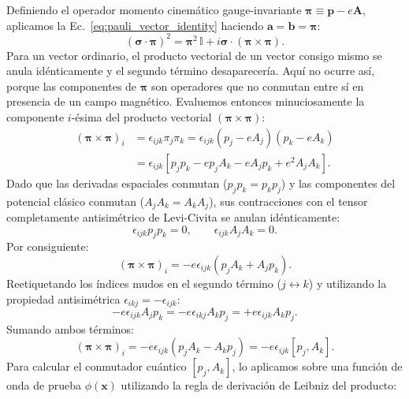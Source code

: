 \documentclass[10pt,a4paper]{article}
\begin{document}
Definiendo el operador momento cinemático gauge-invariante $\boldsymbol{\pi} \equiv \mathbf{p} - e\mathbf{A}$, aplicamos la Ec.~\eqref{eq:pauli_vector_identity} haciendo $\mathbf{a} = \mathbf{b} = \boldsymbol{\pi}$:
\begin{equation}
(\boldsymbol{\sigma} \cdot \boldsymbol{\pi})^2 = \boldsymbol{\pi}^2 \, \mathbb{I} + i \boldsymbol{\sigma} \cdot (\boldsymbol{\pi} \times \boldsymbol{\pi}).
\label{eq:pi_squared}
\end{equation}
Para un vector ordinario, el producto vectorial de un vector consigo mismo se anula idénticamente y el segundo término desaparecería. Aquí no ocurre así, porque las componentes de $\boldsymbol{\pi}$ son operadores que no conmutan entre sí en presencia de un campo magnético. Evaluemos entonces minuciosamente la componente $i$-ésima del producto vectorial $(\boldsymbol{\pi} \times \boldsymbol{\pi})$:
\begin{align}
(\boldsymbol{\pi} \times \boldsymbol{\pi})_i &= \epsilon_{ijk} \pi_j \pi_k = \epsilon_{ijk} (p_j - e A_j)(p_k - e A_k) \nonumber \\
&= \epsilon_{ijk} \left[ p_j p_k - e p_j A_k - e A_j p_k + e^2 A_j A_k \right].
\end{align}
Dado que las derivadas espaciales conmutan ($p_j p_k = p_k p_j$) y las componentes del potencial clásico conmutan ($A_j A_k = A_k A_j$), sus contracciones con el tensor completamente antisimétrico de Levi-Civita se anulan idénticamente:
\begin{equation}
\epsilon_{ijk} p_j p_k = 0, \qquad \epsilon_{ijk} A_j A_k = 0.
\end{equation}
Por consiguiente:
\begin{equation}
(\boldsymbol{\pi} \times \boldsymbol{\pi})_i = -e \epsilon_{ijk} (p_j A_k + A_j p_k).
\end{equation}
Reetiquetando los índices mudos en el segundo término ($j \leftrightarrow k$) y utilizando la propiedad antisimétrica $\epsilon_{ikj} = -\epsilon_{ijk}$:
\begin{equation}
-e \epsilon_{ijk} A_j p_k = -e \epsilon_{ikj} A_k p_j = +e \epsilon_{ijk} A_k p_j.
\end{equation}
Sumando ambos términos:
\begin{equation}
(\boldsymbol{\pi} \times \boldsymbol{\pi})_i = -e \epsilon_{ijk} (p_j A_k - A_k p_j) = -e \epsilon_{ijk} [p_j, A_k].
\end{equation}
Para calcular el conmutador cuántico $[p_j, A_k]$, lo aplicamos sobre una función de onda de prueba $\phi(\mathbf{x})$ utilizando la regla de derivación de Leibniz del producto:
\end{document}
